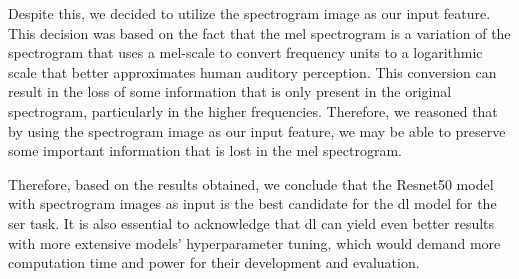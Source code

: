 Despite this, we decided to utilize the spectrogram image as our input feature. This decision was based on the fact that the mel spectrogram is a variation of the spectrogram that uses a mel-scale to convert frequency units to a logarithmic scale that better approximates human auditory perception. This conversion can result in the loss of some information that is only present in the original spectrogram, particularly in the higher frequencies. Therefore, we reasoned that by using the spectrogram image as our input feature, we may be able to preserve some important information that is lost in the mel spectrogram.

Therefore, based on the results obtained, we conclude that the Resnet50 model with spectrogram images as input is the best candidate for the \ac{dl} model for the \ac{ser} task. It is also essential to acknowledge that \ac{dl} can yield even better results with more extensive models' hyperparameter tuning, which would demand more computation time and power for their development and evaluation.

